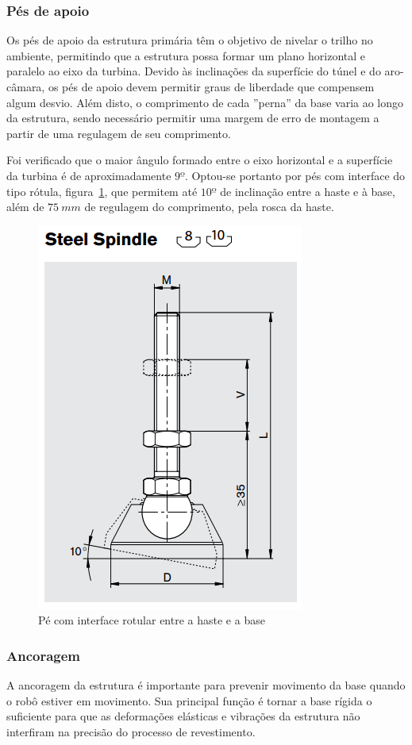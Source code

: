 \subsubsection{Pés de apoio}

Os pés de apoio da estrutura primária têm o objetivo de nivelar o trilho no
ambiente, permitindo que a estrutura possa formar um plano horizontal e paralelo
ao eixo da turbina. Devido às inclinações da superfície do túnel e do
aro-câmara, os pés de apoio devem permitir graus de liberdade que compensem
algum desvio. Além disto, o comprimento de cada ''perna'' da base varia ao
longo da estrutura, sendo necessário permitir uma margem de erro de
montagem a partir de uma regulagem de seu comprimento.

Foi verificado que o maior ângulo formado entre o eixo horizontal
e a superfície da turbina é de aproximadamente $9º$. Optou-se portanto por pés com
interface do tipo rótula, figura~\ref{fig::spindle}, que permitem até $10º$ de
inclinação entre a haste e à base, além de $75~mm$ de regulagem do
comprimento, pela rosca da haste.

\begin{figure}[H]
	\centering
	\includegraphics[width=0.4\columnwidth]{figs/construcao/spindle}
	\caption{Pé com interface rotular entre a haste e a base}
    \label{fig::spindle}
\end{figure}

\subsubsection{Ancoragem}

A ancoragem da estrutura é importante para prevenir movimento da base quando o
robô estiver em movimento. Sua principal função é tornar a base rígida o
suficiente para que as deformações elásticas e vibrações da estrutura não
interfiram na precisão do processo de revestimento.

